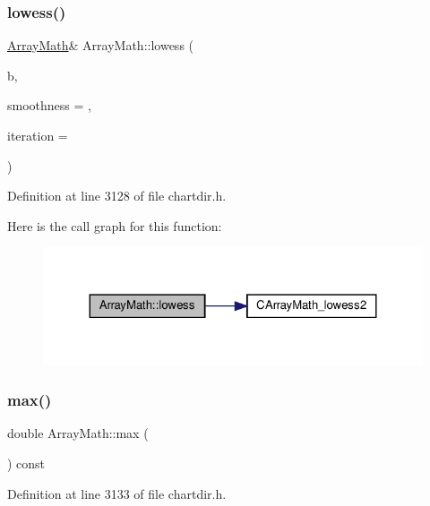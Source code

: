 \subsubsection{\texorpdfstring{lowess()}{lowess()}\hspace{0.1cm}{\footnotesize\ttfamily [2/2]}}
{\footnotesize\ttfamily \hyperlink{class_array_math}{Array\+Math}\& Array\+Math\+::lowess (\begin{DoxyParamCaption}\item[{\hyperlink{class_double_array}{Double\+Array}}]{b,  }\item[{double}]{smoothness = {},  }\item[{int}]{iteration = {} }\end{DoxyParamCaption})\hspace{0.3cm}{\ttfamily [inline]}}



Definition at line 3128 of file chartdir.\+h.

Here is the call graph for this function\+:
\nopagebreak
\begin{figure}[H]
\begin{center}
\leavevmode
\includegraphics[width=324pt]{class_array_math_a7852fe7a310511ac1ba8fa585a614146_cgraph}
\end{center}
\end{figure}
\mbox{\label{class_array_math_ae80c440e5ad866929649746c029cf0bf}} 
\subsubsection{\texorpdfstring{max()}{max()}}
{\footnotesize\ttfamily double Array\+Math\+::max (\begin{DoxyParamCaption}{ }\end{DoxyParamCaption}) const\hspace{0.3cm}{\ttfamily [inline]}}



Definition at line 3133 of file chartdir.\+h.

